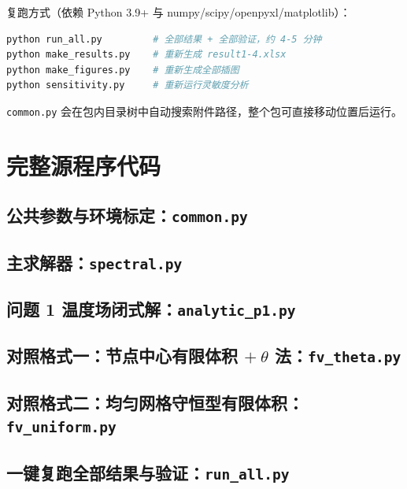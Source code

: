 \documentclass[withoutpreface,bwprint]{cumcmthesis}
\begin{document}
复跑方式（依赖 Python 3.9+ 与 numpy/scipy/openpyxl/matplotlib）：
\begin{lstlisting}[language=bash]
python run_all.py         # 全部结果 + 全部验证，约 4-5 分钟
python make_results.py    # 重新生成 result1-4.xlsx
python make_figures.py    # 重新生成全部插图
python sensitivity.py     # 重新运行灵敏度分析
\end{lstlisting}
\texttt{common.py} 会在包内目录树中自动搜索附件路径，整个包可直接移动位置后运行。

\section{完整源程序代码}

\subsection{公共参数与环境标定：\texttt{common.py}}


\subsection{主求解器：\texttt{spectral.py}}


\subsection{问题 1 温度场闭式解：\texttt{analytic\_p1.py}}


\subsection{对照格式一：节点中心有限体积 $+\ \theta$ 法：\texttt{fv\_theta.py}}


\subsection{对照格式二：均匀网格守恒型有限体积：\texttt{fv\_uniform.py}}


\subsection{一键复跑全部结果与验证：\texttt{run\_all.py}}

\end{document}
